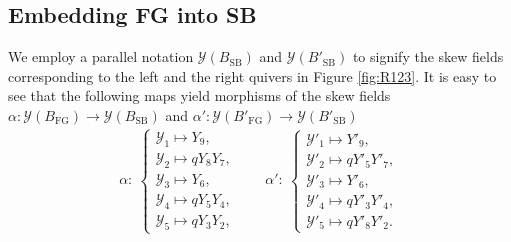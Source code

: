 \documentclass[pdftex]{sigma}
\numberwithin{equation}{section}
\begin{document}
\subsection{Embedding FG into SB}

We employ a parallel notation
$\mathcal{Y}(B_{\mathrm{SB}})$ and
$\mathcal{Y}(B'_{\mathrm{SB}})$ to signify the
skew fields corresponding to the left and the right quivers in Figure \ref{fig:R123}.
%
It is easy to see that the following maps yield morphisms of the skew
fields
$\alpha\colon \mathcal{Y}(B_{\mathrm{FG}}) \rightarrow
\mathcal{Y}(B_{\mathrm{SB}})$ and
$\alpha'\colon \mathcal{Y}(B'_{\mathrm{FG}}) \rightarrow
\mathcal{Y}(B'_{\mathrm{SB}})$
\begin{align}\label{Ymor}
\alpha\colon\ \begin{cases}
\mathscr{Y}_1 \mapsto Y_9,
\\
\mathscr{Y}_2 \mapsto q Y_8Y_7,
\\
\mathscr{Y}_3 \mapsto Y_6,
\\
\mathscr{Y}_4 \mapsto q Y_5Y_4,
\\
\mathscr{Y}_5 \mapsto qY_3Y_2,
\end{cases}
\qquad
\alpha'\colon\ \begin{cases}
\mathscr{Y}'_1 \mapsto Y'_9,
\\
\mathscr{Y}'_2 \mapsto q Y'_5Y'_7,
\\
\mathscr{Y}'_3 \mapsto Y'_6,
\\
\mathscr{Y}'_4 \mapsto q Y'_3Y'_4,
\\
\mathscr{Y}'_5 \mapsto qY'_8Y'_2.
\end{cases}
\end{align}
\end{document}
